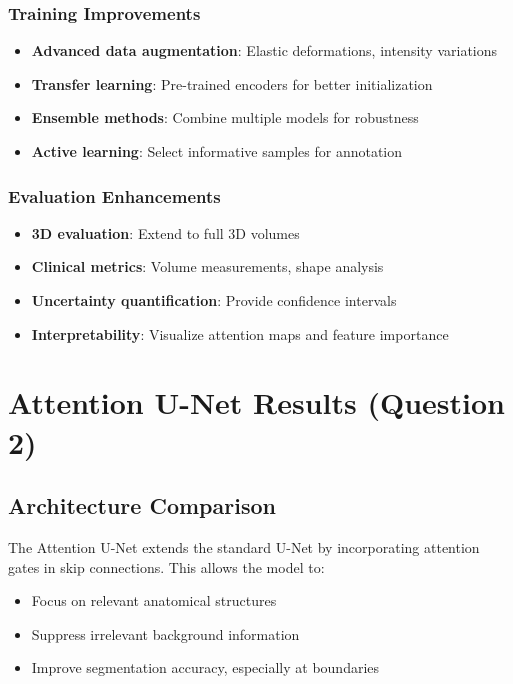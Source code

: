 \documentclass[12pt,a4paper]{article}
\begin{document}
\subsubsection{Training Improvements}
\begin{itemize}
    \item \textbf{Advanced data augmentation}: Elastic deformations, intensity variations
    \item \textbf{Transfer learning}: Pre-trained encoders for better initialization
    \item \textbf{Ensemble methods}: Combine multiple models for robustness
    \item \textbf{Active learning}: Select informative samples for annotation
\end{itemize}

\subsubsection{Evaluation Enhancements}
\begin{itemize}
    \item \textbf{3D evaluation}: Extend to full 3D volumes
    \item \textbf{Clinical metrics}: Volume measurements, shape analysis
    \item \textbf{Uncertainty quantification}: Provide confidence intervals
    \item \textbf{Interpretability}: Visualize attention maps and feature importance
\end{itemize}

\section{Attention U-Net Results (Question 2)}

\subsection{Architecture Comparison}

The Attention U-Net extends the standard U-Net by incorporating attention gates in skip connections. This allows the model to:
\begin{itemize}
    \item Focus on relevant anatomical structures
    \item Suppress irrelevant background information
    \item Improve segmentation accuracy, especially at boundaries
\end{itemize}
\end{document}
